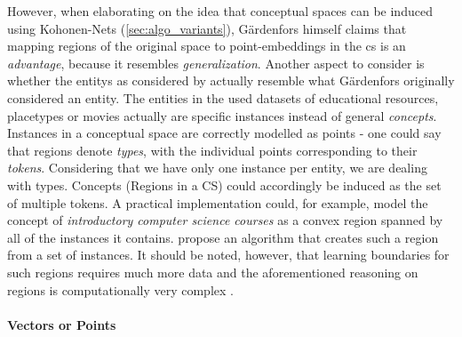 However, when elaborating on the idea that conceptual spaces can be induced using Kohonen-Nets (\autoref{sec:algo_variants}), Gärdenfors himself claims that mapping regions of the original space to point-embeddings in the \gls{cs} is an \textit{advantage}, because it resembles \textit{generalization}. Another aspect to consider is whether the \glspl{entity} as considered by \mainalgos actually resemble what Gärdenfors originally considered an entity. The entities in the used datasets of educational resources, placetypes or movies actually are specific instances instead of general \textit{concepts}. Instances in a conceptual space are correctly modelled as points - one could say that regions denote \textit{types}, with the individual points corresponding to their \textit{tokens}. Considering that we have only one instance per entity, we are dealing with types. Concepts (Regions in a CS) could accordingly be induced as the set of multiple tokens. A practical implementation could, for example, model the concept of \textit{introductory computer science courses} as a convex region spanned by all of the instances it contains. \textcite{Erk2009} propose an algorithm that creates such a region from a set of instances. It should be noted, however, that learning boundaries for such regions requires much more data \cite{Derrac2015} and the aforementioned reasoning on regions is computationally very complex \cite{Hernandez-Conde2017}.


\paragraph{Vectors or Points}
\label{sec:discuss_points}

